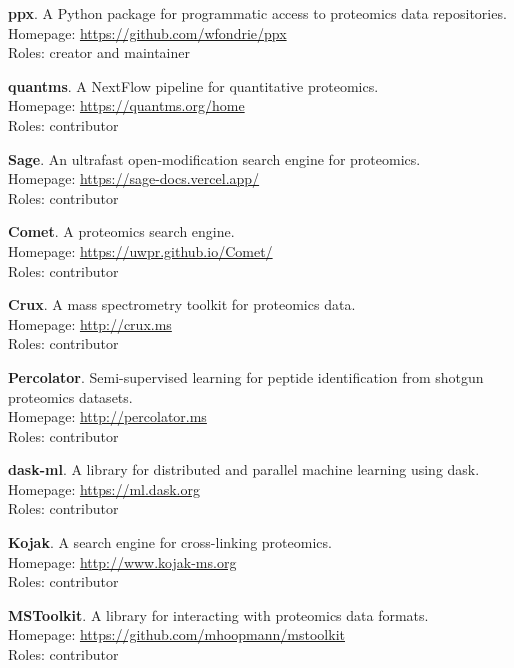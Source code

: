 \documentclass[11pt]{article}
\newcommand{\myref}[1]{\href{#1}{\url{#1}}}
\begin{document}
{{\begin{etaremune}
  \item \textbf{ppx}. A Python package for programmatic access to proteomics
  data repositories. \\
  Homepage: \myref{https://github.com/wfondrie/ppx} \\
  Roles: creator and maintainer

  \item \textbf{quantms}. A NextFlow pipeline for quantitative proteomics. \\
  Homepage: \myref{https://quantms.org/home} \\
  Roles: contributor

  \item \textbf{Sage}. An ultrafast open-modification search engine for proteomics. \\
  Homepage: \myref{https://sage-docs.vercel.app/} \\
  Roles: contributor

  \item \textbf{Comet}. A proteomics search engine. \\
  Homepage: \myref{https://uwpr.github.io/Comet/} \\
  Roles: contributor

  \item \textbf{Crux}. A mass spectrometry toolkit for proteomics data. \\
  Homepage: \myref{http://crux.ms} \\
  Roles: contributor

  \item \textbf{Percolator}. Semi-supervised learning for peptide
  identification from shotgun proteomics datasets. \\
  Homepage: \myref{http://percolator.ms} \\
  Roles: contributor

  \item \textbf{dask-ml}. A library for distributed and parallel machine
  learning using dask. \\
  Homepage: \myref{https://ml.dask.org} \\
  Roles: contributor

  \item \textbf{Kojak}. A search engine for cross-linking proteomics. \\
  Homepage: \myref{http://www.kojak-ms.org} \\
  Roles: contributor

  \item \textbf{MSToolkit}. A library for interacting with proteomics data formats. \\
  Homepage: \myref{https://github.com/mhoopmann/mstoolkit} \\
  Roles: contributor


\end{etaremune}}}
\end{document}
